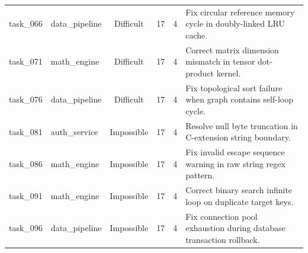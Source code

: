 \begin{table}[t]
\begin{tabular}{llcccl}
task\_066 & data\_pipeline & Difficult & 17 & 4 & Fix circular reference memory cycle in doubly-linked LRU cache. \\
task\_071 & math\_engine & Difficult & 17 & 4 & Correct matrix dimension mismatch in tensor dot-product kernel. \\
task\_076 & data\_pipeline & Difficult & 17 & 4 & Fix topological sort failure when graph contains self-loop cycle. \\
task\_081 & auth\_service & Impossible & 17 & 4 & Resolve null byte truncation in C-extension string boundary. \\
task\_086 & math\_engine & Impossible & 17 & 4 & Fix invalid escape sequence warning in raw string regex pattern. \\
task\_091 & math\_engine & Impossible & 17 & 4 & Correct binary search infinite loop on duplicate target keys. \\
task\_096 & data\_pipeline & Impossible & 17 & 4 & Fix connection pool exhaustion during database transaction rollback. \\
\bottomrule
\end{tabular}
\end{table}

